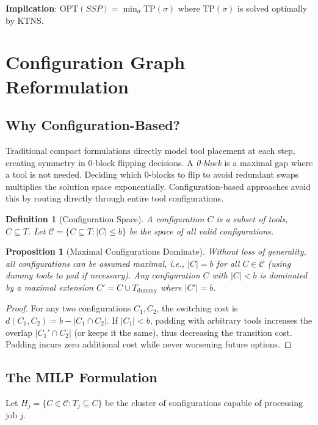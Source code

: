 \documentclass[12pt]{article}
\newtheorem{definition}{Definition}[section]
\newtheorem{proposition}{Proposition}[section]
\begin{document}
	\textbf{Implication}: $\text{OPT}(SSP) = \min_{\sigma} \text{TP}(\sigma)$ where $\text{TP}(\sigma)$ is solved optimally by KTNS.
	
	\section{Configuration Graph Reformulation}
	
	\subsection{Why Configuration-Based?}
	
	Traditional compact formulations directly model tool placement at each step, creating symmetry in 0-block flipping decisions. A \textit{0-block} is a maximal gap where a tool is not needed. Deciding which 0-blocks to flip to avoid redundant swaps multiplies the solution space exponentially. Configuration-based approaches avoid this by routing directly through entire tool configurations.
	
	\begin{definition}[Configuration Space]
		A \textit{configuration} $C$ is a subset of tools, $C \subseteq T$. Let $\mathcal{C} = \{C \subseteq T : |C| \le b\}$ be the space of all valid configurations.
	\end{definition}
	
	\begin{proposition}[Maximal Configurations Dominate]
		\label{prop:maximal}
		Without loss of generality, all configurations can be assumed maximal, i.e., $|C| = b$ for all $C \in \mathcal{C}$ (using dummy tools to pad if necessary). Any configuration $C$ with $|C| < b$ is dominated by a maximal extension $C' = C \cup T_{\text{dummy}}$ where $|C'| = b$.
	\end{proposition}
	\begin{proof}
		For any two configurations $C_1, C_2$, the switching cost is $d(C_1, C_2) = b - |C_1 \cap C_2|$. If $|C_1| < b$, padding with arbitrary tools increases the overlap $|C_1' \cap C_2|$ (or keeps it the same), thus decreasing the transition cost. Padding incurs zero additional cost while never worsening future options.
	\end{proof}
	
	\subsection{The MILP Formulation}
	
	Let $H_j = \{C \in \mathcal{C} : T_j \subseteq C\}$ be the cluster of configurations capable of processing job $j$.
	
\end{document}

